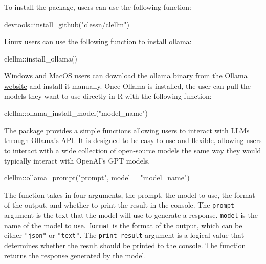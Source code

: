 \documentclass[
  authoryear,
  preprint,
  3p]{elsarticle}
\newenvironment{Shaded}{\begin{snugshade}}{\end{snugshade}}
\newcommand{\AttributeTok}[1]{\textcolor[rgb]{0.40,0.45,0.13}{#1}}
\newcommand{\FunctionTok}[1]{\textcolor[rgb]{0.28,0.35,0.67}{#1}}
\newcommand{\NormalTok}[1]{\textcolor[rgb]{0.00,0.23,0.31}{#1}}
\newcommand{\SpecialCharTok}[1]{\textcolor[rgb]{0.37,0.37,0.37}{#1}}
\newcommand{\StringTok}[1]{\textcolor[rgb]{0.13,0.47,0.30}{#1}}
\begin{document}
To install the package, users can use the following function:

\begin{Shaded}
\begin{Highlighting}[]
\NormalTok{devtools}\SpecialCharTok{::}\FunctionTok{install\_github}\NormalTok{(}\StringTok{"clessn/clellm"}\NormalTok{)}
\end{Highlighting}
\end{Shaded}

Linux users can use the following function to install ollama:

\begin{Shaded}
\begin{Highlighting}[]
\NormalTok{clellm}\SpecialCharTok{::}\FunctionTok{install\_ollama}\NormalTok{()}
\end{Highlighting}
\end{Shaded}

Windows and MacOS users can download the ollama binary from the
\href{https://ollama.com/}{Ollama website} and install it manually. Once
Ollama is installed, the user can pull the models they want to use
directly in R with the following function:

\begin{Shaded}
\begin{Highlighting}[]
\NormalTok{clellm}\SpecialCharTok{::}\FunctionTok{ollama\_install\_model}\NormalTok{(}\StringTok{"model\_name"}\NormalTok{)}
\end{Highlighting}
\end{Shaded}

The package provides a simple functions allowing users to interact with
LLMs through Ollama's API. It is designed to be easy to use and
flexible, allowing users to interact with a wide collection of
open-source models the same way they would typically interact with
OpenAI's GPT models.

\begin{Shaded}
\begin{Highlighting}[]
\NormalTok{clellm}\SpecialCharTok{::}\FunctionTok{ollama\_prompt}\NormalTok{(}\StringTok{"prompt"}\NormalTok{, }\AttributeTok{model =} \StringTok{"model\_name"}\NormalTok{)}
\end{Highlighting}
\end{Shaded}

The function takes in four arguments, the prompt, the model to use, the
format of the output, and whether to print the result in the console.
The \texttt{prompt} argument is the text that the model will use to
generate a response. \texttt{model} is the name of the model to use.
\texttt{format} is the format of the output, which can be either
\texttt{"json"} or \texttt{"text"}. The \texttt{print\_result} argument
is a logical value that determines whether the result should be printed
to the console. The function returns the response generated by the
model.
\end{document}
